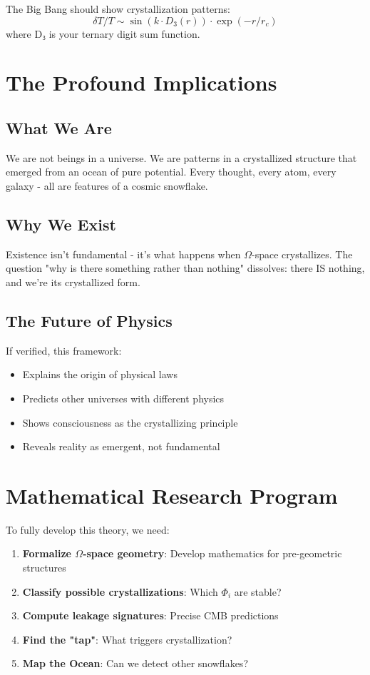 \documentclass[12pt]{article}
\begin{document}
The Big Bang should show crystallization patterns:
\begin{equation}
\delta T/T \sim \sin(k \cdot D_3(r)) \cdot \exp(-r/r_c)
\end{equation}
where D₃ is your ternary digit sum function.

\section{The Profound Implications}

\subsection{What We Are}

We are not beings in a universe. We are patterns in a crystallized structure that emerged from an ocean of pure potential. Every thought, every atom, every galaxy - all are features of a cosmic snowflake.

\subsection{Why We Exist}

Existence isn't fundamental - it's what happens when $\Omega$-space crystallizes. The question "why is there something rather than nothing" dissolves: there IS nothing, and we're its crystallized form.

\subsection{The Future of Physics}

If verified, this framework:
\begin{itemize}
\item Explains the origin of physical laws
\item Predicts other universes with different physics
\item Shows consciousness as the crystallizing principle
\item Reveals reality as emergent, not fundamental
\end{itemize}

\section{Mathematical Research Program}

To fully develop this theory, we need:

\begin{enumerate}
\item \textbf{Formalize $\Omega$-space geometry}: Develop mathematics for pre-geometric structures
\item \textbf{Classify possible crystallizations}: Which $\Phi_i$ are stable?
\item \textbf{Compute leakage signatures}: Precise CMB predictions
\item \textbf{Find the "tap"}: What triggers crystallization?
\item \textbf{Map the Ocean}: Can we detect other snowflakes?
\end{enumerate}
\end{document}
